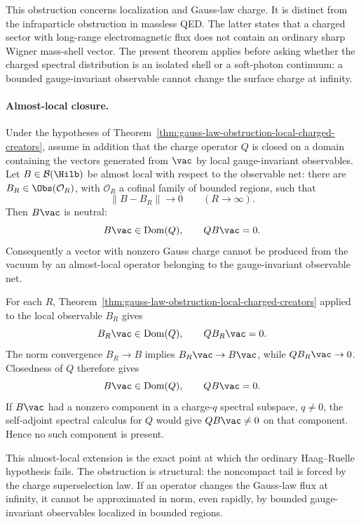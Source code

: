 This obstruction concerns localization and Gauss-law charge.  It is distinct
from the infraparticle obstruction in massless QED.  The latter states that a
charged sector with long-range electromagnetic flux does not contain an
ordinary sharp Wigner mass-shell vector.  The present theorem applies before
asking whether the charged spectral distribution is an isolated shell or a
soft-photon continuum: a bounded gauge-invariant observable cannot change the
surface charge at infinity.

\paragraph{Almost-local closure.}
Under the hypotheses of
Theorem~\ref{thm:gauss-law-obstruction-local-charged-creators}, assume in
addition that the charge operator \(Q\) is closed on a domain containing the
vectors generated from \(\vac\) by local gauge-invariant observables.  Let
\(B\in\mathcal B(\Hilb)\) be almost local with respect to the observable net:
there are \(B_R\in\Obs(\mathcal O_R)\), with
\(\mathcal O_R\) a cofinal family of bounded regions, such that
\[
  \|B-B_R\|\longrightarrow0
  \qquad (R\to\infty).
\]
Then \(B\vac\) is neutral:
\[
  B\vac\in\operatorname{Dom}(Q),
  \qquad QB\vac=0 .
\]
Consequently a vector with nonzero Gauss charge cannot be produced from the
vacuum by an almost-local operator belonging to the gauge-invariant
observable net.

For each \(R\), Theorem~\ref{thm:gauss-law-obstruction-local-charged-creators}
applied to the local observable \(B_R\) gives
\[
  B_R\vac\in\operatorname{Dom}(Q),
  \qquad Q B_R\vac=0 .
\]
The norm convergence \(B_R\to B\) implies \(B_R\vac\to B\vac\), while
\(QB_R\vac\to0\).  Closedness of \(Q\) therefore gives
\[
  B\vac\in\operatorname{Dom}(Q),
  \qquad QB\vac=0 .
\]
If \(B\vac\) had a nonzero component in a charge-\(q\) spectral subspace,
\(q\ne0\), the self-adjoint spectral calculus for \(Q\) would give
\(QB\vac\ne0\) on that component.  Hence no such component is present.

This almost-local extension is the exact point at which the ordinary
Haag--Ruelle hypothesis fails.  The obstruction is structural: the noncompact
tail is forced by the charge superselection law.  If an operator changes the
Gauss-law flux at infinity, it cannot be approximated in norm, even rapidly,
by bounded
gauge-invariant observables localized in bounded regions.

